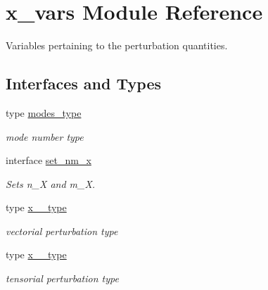 \hypertarget{namespacex__vars}{}\section{x\+\_\+vars Module Reference}
\label{namespacex__vars}


Variables pertaining to the perturbation quantities.  


\subsection*{Interfaces and Types}
\begin{DoxyCompactItemize}
\item 
type \hyperlink{structx__vars_1_1modes__type}{modes\+\_\+type}
\begin{DoxyCompactList}\small\item\em mode number type \end{DoxyCompactList}\item 
interface \hyperlink{interfacex__vars_1_1set__nm__x}{set\+\_\+nm\+\_\+x}
\begin{DoxyCompactList}\small\item\em Sets {\ttfamily n\+\_\+X} and {\ttfamily m\+\_\+X}. \end{DoxyCompactList}\item 
type \hyperlink{structx__vars_1_1x__1__type}{x\+\_\+\_\+type}
\begin{DoxyCompactList}\small\item\em vectorial perturbation type \end{DoxyCompactList}\item 
type \hyperlink{structx__vars_1_1x__2__type}{x\+\_\+\_\+type}
\begin{DoxyCompactList}\small\item\em tensorial perturbation type \end{DoxyCompactList}\end{DoxyCompactItemize}
